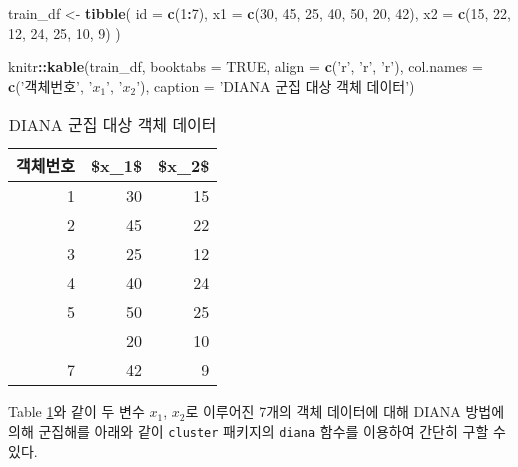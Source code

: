 \documentclass[]{book}
\newenvironment{Shaded}{\begin{snugshade}}{\end{snugshade}}
\newcommand{\DataTypeTok}[1]{\textcolor[rgb]{0.13,0.29,0.53}{#1}}
\newcommand{\DecValTok}[1]{\textcolor[rgb]{0.00,0.00,0.81}{#1}}
\newcommand{\KeywordTok}[1]{\textcolor[rgb]{0.13,0.29,0.53}{\textbf{#1}}}
\newcommand{\NormalTok}[1]{#1}
\newcommand{\OperatorTok}[1]{\textcolor[rgb]{0.81,0.36,0.00}{\textbf{#1}}}
\newcommand{\OtherTok}[1]{\textcolor[rgb]{0.56,0.35,0.01}{#1}}
\newcommand{\StringTok}[1]{\textcolor[rgb]{0.31,0.60,0.02}{#1}}
\begin{document}
\begin{Shaded}
\begin{Highlighting}[]
\NormalTok{train_df <-}\StringTok{ }\KeywordTok{tibble}\NormalTok{(}
  \DataTypeTok{id =} \KeywordTok{c}\NormalTok{(}\DecValTok{1}\OperatorTok{:}\DecValTok{7}\NormalTok{),}
  \DataTypeTok{x1 =} \KeywordTok{c}\NormalTok{(}\DecValTok{30}\NormalTok{, }\DecValTok{45}\NormalTok{, }\DecValTok{25}\NormalTok{, }\DecValTok{40}\NormalTok{, }\DecValTok{50}\NormalTok{, }\DecValTok{20}\NormalTok{, }\DecValTok{42}\NormalTok{),}
  \DataTypeTok{x2 =} \KeywordTok{c}\NormalTok{(}\DecValTok{15}\NormalTok{, }\DecValTok{22}\NormalTok{, }\DecValTok{12}\NormalTok{, }\DecValTok{24}\NormalTok{, }\DecValTok{25}\NormalTok{, }\DecValTok{10}\NormalTok{, }\DecValTok{9}\NormalTok{)}
\NormalTok{)}

\NormalTok{knitr}\OperatorTok{::}\KeywordTok{kable}\NormalTok{(train_df, }\DataTypeTok{booktabs =} \OtherTok{TRUE}\NormalTok{,}
             \DataTypeTok{align =} \KeywordTok{c}\NormalTok{(}\StringTok{'r'}\NormalTok{, }\StringTok{'r'}\NormalTok{, }\StringTok{'r'}\NormalTok{),}
             \DataTypeTok{col.names =} \KeywordTok{c}\NormalTok{(}\StringTok{'객체번호'}\NormalTok{, }\StringTok{'$x_1$'}\NormalTok{, }\StringTok{'$x_2$'}\NormalTok{),}
             \DataTypeTok{caption =} \StringTok{'DIANA 군집 대상 객체 데이터'}\NormalTok{)}
\end{Highlighting}
\end{Shaded}

\begin{table}[t]

\caption{\label{tab:diana-data}DIANA 군집 대상 객체 데이터}
\centering
\begin{tabular}{rrr}
\toprule
객체번호 & \$x\_1\$ & \$x\_2\$\\
\midrule
1 & 30 & 15\\
2 & 45 & 22\\
3 & 25 & 12\\
4 & 40 & 24\\
5 & 50 & 25\\
\addlinespace
6 & 20 & 10\\
7 & 42 & 9\\
\bottomrule
\end{tabular}
\end{table}

Table \ref{tab:diana-data}와 같이 두 변수 \(x_1\), \(x_2\)로 이루어진 7개의 객체 데이터에 대해 DIANA 방법에 의해 군집해를 아래와 같이 \texttt{cluster} 패키지의 \texttt{diana} 함수를 이용하여 간단히 구할 수 있다.
\end{document}
